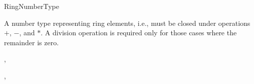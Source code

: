 \begin{ccRefConcept}{RingNumberType}

A number type representing ring elements, i.e., must be closed under
operations $+$, $-$, and $*$. A division operation is required only
for those cases where the remainder is zero.

\ccRefines
{},  

\ccSeeAlso
{}, 
\end{ccRefConcept}
